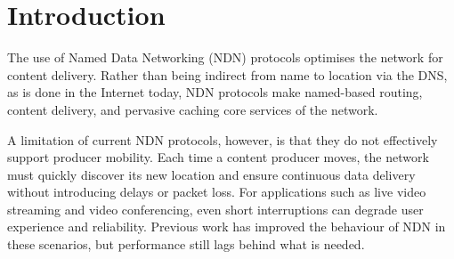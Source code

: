 \documentclass[10pt,conference]{IEEEtran}
\begin{document}
\section{Introduction}
\label{sec:introduction}

The use of Named Data Networking (NDN) protocols optimises the network for content delivery. Rather than being indirect from name to location via the DNS, as is done in the Internet today, NDN protocols make named-based routing, content delivery, and pervasive caching core services of the network.

A limitation of current NDN protocols, however, is that they do not effectively support producer mobility.  Each time a content producer moves, the network must quickly discover its new location and ensure continuous data delivery without introducing delays or packet loss. For applications such as live video streaming and video conferencing, even short interruptions can degrade user experience and reliability. 
Previous work \cite{FIXME} has improved the behaviour of NDN in these scenarios, but performance still lags behind what is needed.

\end{document}
